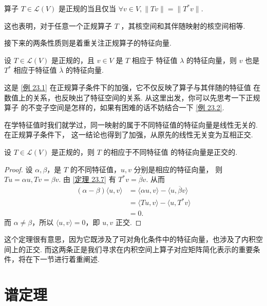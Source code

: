 \begin{theorem}
    算子 $ T \in \mathcal{L}(V) $ 是正规的当且仅当 $ \forall v \in V,
    \lVert Tv \rVert = \lVert T^*v \rVert $. 
\end{theorem}

这也表明，对于任意一个正规算子 $ T $ ，其核空间和其伴随映射的核空间相等. 

接下来的两条性质则是着重关注正规算子的特征向量. 

\begin{theorem}
    设 $ T \in \mathcal{L}(V) $ 是正规的，且 $ v \in V $ 是 $ T $ 相应于
    特征值 $ \lambda $ 的特征向量，则 $ v $ 也是 $ T^* $ 相应于特征值
    $ \overline{\lambda} $ 的特征向量. 
\end{theorem}

这是 \ref{例 23.1} 在正规算子条件下的加强，它不仅反映了算子与其伴随的特征值
在数值上的关系，也反映出了特征空间的关系. 从这里出发，你可以先思考一下正规算子
的不变子空间是怎样的，如果有困难的话不妨结合一下 \ref{例 23.2}.

在学特征值时我们就学过，同一映射的属于不同特征值的特征向量是线性无关的. 在正规算子条件下，
这一结论也得到了加强，从原先的线性无关变为互相正交. 

\begin{theorem}
    设 $ T \in \mathcal{L}(V) $ 是正规的，则 $ T $ 的相应于不同特征值
    的特征向量是正交的. 
\end{theorem}

\begin{proof}
    设 $ \alpha, \beta $，是 $ T $ 的不同特征值，$ u, v $ 分别是相应的特征向量，
    则 $ Tu = \alpha u, Tv = \beta v $. 由 \ref{定理 23.7} 有 $ T^*v = \overline{\beta} v $. 
    从而 
    \begin{align*}
        (\alpha - \beta)\langle u, v \rangle
        & = \langle \alpha u, v \rangle - \langle u, \overline{\beta}v \rangle \\
        & = \langle Tu, v \rangle - \langle u, T^*v \rangle \\
        & = 0. 
    \end{align*}
    而 $ \alpha \neq \beta $，所以 $ \langle u, v \rangle = 0 $，即 $ u, v $ 正交.          
\end{proof}

这个定理很有意思，因为它既涉及了可对角化条件中的特征向量，也涉及了内积空间上的正交. 
而这两条正是我们寻求在内积空间上算子对应矩阵简化表示的重要条件，将在下一节进行着重阐述. 

\section{谱定理}

